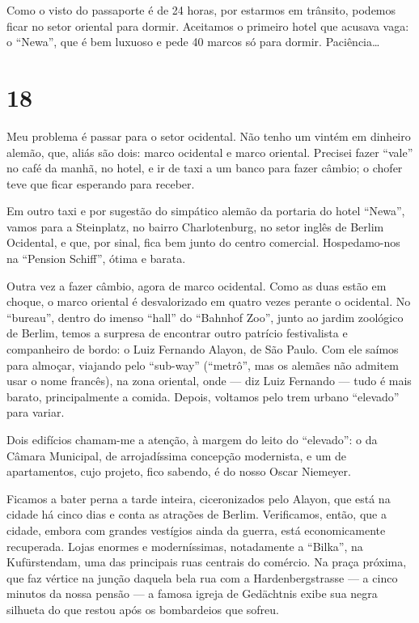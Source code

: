Como o visto do passaporte é de 24 horas, por estarmos em trânsito, podemos ficar no setor oriental para dormir. Aceitamos o primeiro hotel que acusava vaga: o ``Newa'', que é bem luxuoso e pede 40 marcos só para dormir. Paciência\ldots

\section*{18 \adfflatleafright {}}
Meu problema é passar para o setor ocidental. Não tenho um vintém em dinheiro alemão, que, aliás são dois: marco ocidental e marco oriental. Precisei fazer ``vale'' no café da manhã, no hotel, e ir de taxi a um banco para fazer câmbio; o chofer teve que ficar esperando para receber.

Em outro taxi e por sugestão do simpático alemão da portaria do hotel ``Newa'', vamos para a Steinplatz, no bairro Charlotenburg, no setor inglês de Berlim Ocidental, e que, por sinal, fica bem junto do centro comercial. Hospedamo-nos na ``Pension Schiff'', ótima e barata.

Outra vez a fazer câmbio, agora de marco ocidental. Como as duas estão em choque, o marco oriental é desvalorizado em quatro vezes perante o ocidental. No ``bureau'', dentro do imenso ``hall'' do ``Bahnhof Zoo'', junto ao jardim zoológico de Berlim, temos a surpresa de encontrar outro patrício festivalista e companheiro de bordo: o Luiz Fernando Alayon, de São Paulo. Com ele saímos para almoçar, viajando pelo ``sub-way'' (``metrô'', mas os alemães não admitem usar o nome francês), na zona oriental, onde --- diz Luiz Fernando --- tudo é mais barato, principalmente a comida. Depois, voltamos pelo trem urbano ``elevado'' para variar.

Dois edifícios chamam-me a atenção, à margem do leito do ``elevado'': o da Câmara Municipal, de arrojadíssima concepção modernista, e um de apartamentos, cujo projeto, fico sabendo, é do nosso Oscar Niemeyer.

Ficamos a bater perna a tarde inteira, ciceronizados pelo Alayon, que está na cidade há cinco dias e conta as atrações de Berlim. Verificamos, então, que a cidade, embora com grandes vestígios ainda da guerra, está economicamente recuperada. Lojas enormes e moderníssimas, notadamente a ``Bilka'', na Kufürstendam, uma das principais ruas centrais do comércio. Na praça próxima, que faz vértice na junção daquela bela rua com a Hardenbergstrasse --- a cinco minutos da nossa pensão --- a famosa igreja de Gedächtnis exibe sua negra silhueta do que restou após os bombardeios que sofreu.

